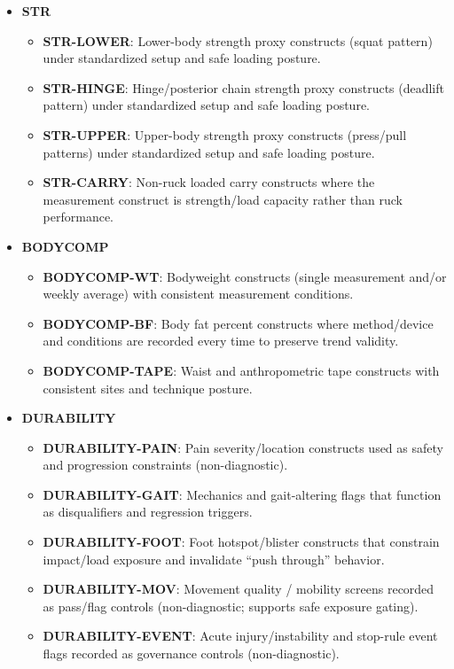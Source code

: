 \documentclass[10pt]{article}
\begin{document}
\begin{itemize}
\item \textbf{STR}

  \begin{itemize}
  \item \textbf{STR-LOWER}: Lower-body strength proxy constructs (squat pattern) under standardized setup and safe loading posture.
  \item \textbf{STR-HINGE}: Hinge/posterior chain strength proxy constructs (deadlift pattern) under standardized setup and safe loading posture.
  \item \textbf{STR-UPPER}: Upper-body strength proxy constructs (press/pull patterns) under standardized setup and safe loading posture.
  \item \textbf{STR-CARRY}: Non-ruck loaded carry constructs where the measurement construct is strength/load capacity rather than ruck performance.
  \end{itemize}

\item \textbf{BODYCOMP}

  \begin{itemize}
  \item \textbf{BODYCOMP-WT}: Bodyweight constructs (single measurement and/or weekly average) with consistent measurement conditions.
  \item \textbf{BODYCOMP-BF}: Body fat percent constructs where method/device and conditions are recorded every time to preserve trend validity.
  \item \textbf{BODYCOMP-TAPE}: Waist and anthropometric tape constructs with consistent sites and technique posture.
  \end{itemize}

\newpage

\item \textbf{DURABILITY}

  \begin{itemize}
  \item \textbf{DURABILITY-PAIN}: Pain severity/location constructs used as safety and progression constraints (non-diagnostic).
  \item \textbf{DURABILITY-GAIT}: Mechanics and gait-altering flags that function as disqualifiers and regression triggers.
  \item \textbf{DURABILITY-FOOT}: Foot hotspot/blister constructs that constrain impact/load exposure and invalidate “push through” behavior.
  \item \textbf{DURABILITY-MOV}: Movement quality / mobility screens recorded as pass/flag controls (non-diagnostic; supports safe exposure gating).
  \item \textbf{DURABILITY-EVENT}: Acute injury/instability and stop-rule event flags recorded as governance controls (non-diagnostic).
  \end{itemize}


\end{itemize}
\end{document}
